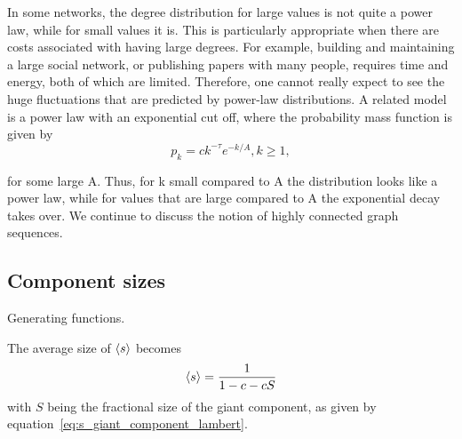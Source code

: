 



In some networks, the degree distribution for large values is not quite a power law, while for small values it is. This is particularly appropriate when there are costs associated with having large degrees. For example, building and maintaining a large social network, or publishing papers with many people, requires time and energy, both of which are limited. Therefore, one cannot really expect to see the huge fluctuations that are predicted by power-law distributions. A related model is a power law with an exponential cut off, where the probability mass function is given by
\begin{equation}
	p_k = ck^{-\tau} e^{− k / A}, k \ge 1,
\end{equation}

for some large A. Thus, for k small compared to A the distribution looks like a power law, while for values that are large compared to A the exponential decay takes over.
We continue to discuss the notion of highly connected graph sequences.






\subsection{Component sizes} %
\label{sub:component_sizes}


Generating functions.

The average size of $\left< s \right>$ becomes 
\begin{equation}
	\left< s \right> = \frac{1}{1-c-cS}
\end{equation}
with $S$ being the fractional size of the giant component, as given by equation~\ref{eq:s_giant_component_lambert}.

